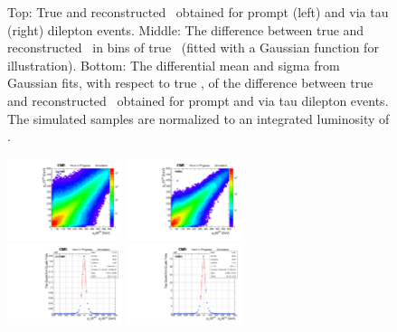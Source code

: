 \begin{figure}
\begin{center}
    \caption{\small Top: True and reconstructed \mtt\ obtained for prompt (left) and via tau (right) \ttbar dilepton events.
    Middle: The difference between true and reconstructed \mtt\ in bins of true \mtt\ (fitted with a Gaussian function for illustration).
    Bottom: The differential mean and sigma from Gaussian fits, with respect to true \mtt, of the difference between true and reconstructed \mtt\ obtained for prompt and via tau \ttbar dilepton events.
    The simulated samples are normalized to an integrated luminosity of \lumivalueRuniiUL.}
    \label{fig:kinrec:resolution-mtt}
 \end{center}
\end{figure}

\begin{figure}
  \begin{center}
    \includegraphics[width=0.30\textwidth]{fig_fullRun2UL/KinRecoResolutions/ttbar_pT_genreco_prompt.pdf}
    \includegraphics[width=0.30\textwidth]{fig_fullRun2UL/KinRecoResolutions/ttbar_pT_genreco_viatau.pdf}\\
    \includegraphics[width=0.30\textwidth]{fig_fullRun2UL/KinRecoResolutions/ttbar_pT_residual_prompt.pdf}
    \includegraphics[width=0.30\textwidth]{fig_fullRun2UL/KinRecoResolutions/ttbar_pT_residual_viatau.pdf}\\

\end{center}
\end{figure}
